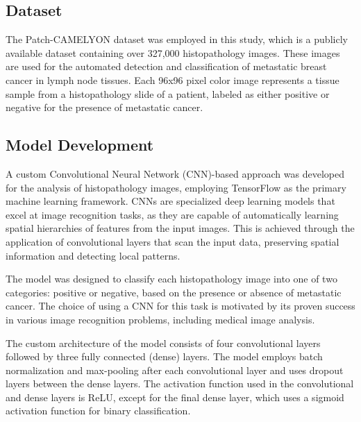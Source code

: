 \subsection{Dataset}
The Patch-CAMELYON dataset was employed in this study, which is a publicly available dataset containing over 327,000 histopathology images. These images are used for the automated detection and classification of metastatic breast cancer in lymph node tissues. Each 96x96 pixel color image represents a tissue sample from a histopathology slide of a patient, labeled as either positive or negative for the presence of metastatic cancer.

\subsection{Model Development}
A custom Convolutional Neural Network (CNN)-based approach was developed for the analysis of histopathology images, employing TensorFlow as the primary machine learning framework. CNNs are specialized deep learning models that excel at image recognition tasks, as they are capable of automatically learning spatial hierarchies of features from the input images. This is achieved through the application of convolutional layers that scan the input data, preserving spatial information and detecting local patterns.

The model was designed to classify each histopathology image into one of two categories: positive or negative, based on the presence or absence of metastatic cancer. The choice of using a CNN for this task is motivated by its proven success in various image recognition problems, including medical image analysis.

The custom architecture of the model consists of four convolutional layers followed by three fully connected (dense) layers. The model employs batch normalization and max-pooling after each convolutional layer and uses dropout layers between the dense layers. The activation function used in the convolutional and dense layers is ReLU, except for the final dense layer, which uses a sigmoid activation function for binary classification.


